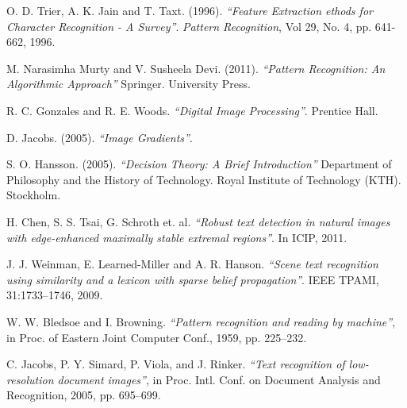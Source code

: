 \begin{thebibliography}{100}
 		O. D. Trier, A. K. Jain and T. Taxt. (1996).
 		\emph{``Feature Extraction ethods for Character Recognition - A Survey''}.
 		\textit{Pattern Recognition}, Vol 29, No. 4, pp. 641-662, 1996.
 		
 		M. Narasimha Murty and V. Susheela Devi. (2011).
 		\emph{``Pattern Recognition: An Algorithmic Approach''}
 		Springer. University Press.
 		
 		R. C. Gonzales and R. E. Woods.
 		\emph{``Digital Image Processing''}.
 		Prentice Hall.
 		
 		D. Jacobs. (2005).
 		\emph{``Image Gradients''}.
 		
 		S. O. Hansson. (2005).
 		\emph{``Decision Theory: A Brief Introduction''}
 		Department of Philosophy and the History of Technology.
 		Royal Institute of Technology (KTH).
 		Stockholm.
 	
 		H. Chen, S. S. Tsai, G. Schroth et. al.
 		\emph{``Robust text detection in natural images with edge-enhanced maximally stable extremal regions''}.
 		In ICIP, 2011.
 		
 		J. J. Weinman, E. Learned-Miller and A. R. Hanson.
 		\emph{``Scene text recognition using similarity and a lexicon with sparse belief propagation''}.
 		IEEE TPAMI, 31:1733–1746, 2009.
 	
 	    W. W. Bledsoe and I. Browning.
 	    \emph{``Pattern recognition and reading by machine''},
		in Proc. of Eastern Joint Computer Conf., 1959, pp. 225–232.
		
		 C. Jacobs, P. Y. Simard, P. Viola, and J. Rinker.
		 \emph{``Text recognition of low-resolution document images''},
		 in Proc. Intl. Conf. on Document Analysis and Recognition,
		 2005, pp. 695–699.
		 
		 
 	    				
\end{thebibliography}
